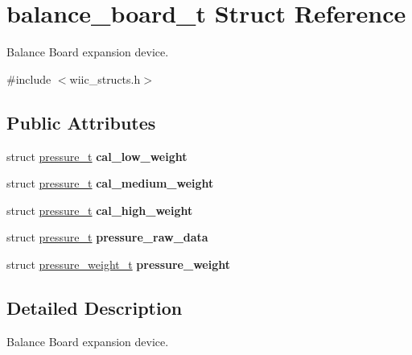 \hypertarget{structbalance__board__t}{\section{balance\-\_\-board\-\_\-t Struct Reference}
\label{structbalance__board__t}
}


Balance Board expansion device.  




{\ttfamily \#include $<$wiic\-\_\-structs.\-h$>$}

\subsection*{Public Attributes}
\begin{DoxyCompactItemize}
\item 
\hypertarget{structbalance__board__t_a0ba9ccde483558b820c8062757864bad}{struct \hyperlink{structpressure__t}{pressure\-\_\-t} {\bfseries cal\-\_\-low\-\_\-weight}}\label{structbalance__board__t_a0ba9ccde483558b820c8062757864bad}

\item 
\hypertarget{structbalance__board__t_a04836ca22dad56206232b1b7836ff023}{struct \hyperlink{structpressure__t}{pressure\-\_\-t} {\bfseries cal\-\_\-medium\-\_\-weight}}\label{structbalance__board__t_a04836ca22dad56206232b1b7836ff023}

\item 
\hypertarget{structbalance__board__t_a9efb8f44640fa6ef0b459322335fad93}{struct \hyperlink{structpressure__t}{pressure\-\_\-t} {\bfseries cal\-\_\-high\-\_\-weight}}\label{structbalance__board__t_a9efb8f44640fa6ef0b459322335fad93}

\item 
\hypertarget{structbalance__board__t_a758120272d9ea7e0257ff8106d746e70}{struct \hyperlink{structpressure__t}{pressure\-\_\-t} {\bfseries pressure\-\_\-raw\-\_\-data}}\label{structbalance__board__t_a758120272d9ea7e0257ff8106d746e70}

\item 
\hypertarget{structbalance__board__t_af1fc954c03bb9c1aec63c57d732c7e0e}{struct \hyperlink{structpressure__weight__t}{pressure\-\_\-weight\-\_\-t} {\bfseries pressure\-\_\-weight}}\label{structbalance__board__t_af1fc954c03bb9c1aec63c57d732c7e0e}

\end{DoxyCompactItemize}


\subsection{Detailed Description}
Balance Board expansion device. 

